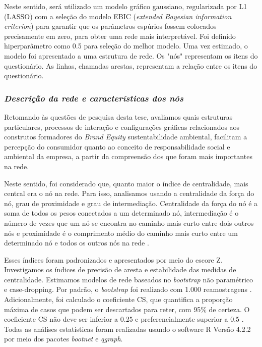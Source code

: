 Neste sentido, será utilizado um modelo gráfico gaussiano, regularizada por L1 (LASSO) com a seleção do modelo EBIC (\textit{extended Bayesian information criterion}) \cite{Foygel2010ExtendedModels} para garantir que os parâmetros espúrios fossem colocados precisamente em zero, para obter uma rede mais interpretável. Foi definido hiperparâmetro como 0.5 para seleção do melhor modelo. Uma vez estimado, o modelo foi apresentado a uma estrutura de rede. Os "nós" representam os itens do questionário. As linhas, chamadas arestas, representam a relação entre os itens do questionário.


\subsubsection{\textit{Descrição da rede e características dos nós}} 

Retomando às questões de pesquisa desta tese, avaliamos quais estruturas particulares, processos de interação e configurações gráficas relacionados aos construtos formadores do \textit{Brand Equity} sustentabilidade ambiental, facilitam a percepção do consumidor quanto ao conceito de responsabilidade social e ambiental da empresa, a partir da compreensão dos que foram mais importantes na rede. 

Neste sentido, foi considerado que, quanto maior o índice de centralidade, mais central era o nó na rede. Para isso, analisamos usando a centralidade da força do nó, grau de proximidade e grau de intermediação. Centralidade da força do nó é a soma de todos os pesos conectados a um determinado nó, intermediação é o número de vezes que um nó se encontra no caminho mais curto entre dois outros nós e proximidade é o comprimento médio do caminho mais curto entre um determinado nó e todos os outros nós na rede \cite{Opsahl2010NodePaths}. 

Esses índices foram padronizados e apresentados por meio do escore Z. Investigamos os índices de precisão de aresta e estabilidade das medidas de centralidade. Estimamos modelos de rede baseados no \textit{bootstrap} não paramétrico e case-dropping. Por padrão, o \textit{bootstrap} foi realizado com 1.000 reamostragens \cite{Epskamp2018EstimatingPaper}. Adicionalmente, foi calculado o coeficiente CS, que quantifica a proporção máxima de casos que podem ser descartados para reter, com 95\% de certeza. O coeficiente CS não deve ser inferior a 0.25 e preferencialmente superior a 0.5 \cite{Epskamp2018EstimatingPaper}. Todas as análises estatísticas foram realizadas usando o software R Versão 4.2.2 por meio dos pacotes \textit{bootnet} e \textit{qgraph}.
